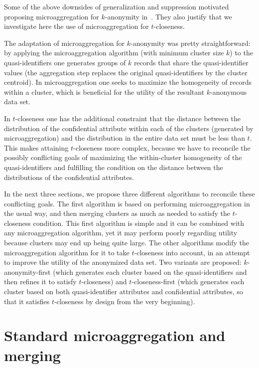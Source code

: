 \documentclass[10pt,journal,compsoc]{IEEEtran}
\theoremstyle{definition}
\theoremstyle{plain}
\begin{document}
Some of the above downsides of generalization and suppression motivated
proposing microaggregation for $k$-anonymity 
in~\cite{Domingo2005Ordinal}. They also justify that we   
investigate here the use of microaggregation 
for $t$-closeness.





The adaptation of microaggregation  for $k$-anonymity
was pretty straightforward: by applying the microaggregation algorithm
(with minimum cluster size $k$) to the quasi-identifiers one generates
groups of $k$ records that share the quasi-identifier values (the
aggregation step replaces the original quasi-identifiers by the cluster
centroid). In microaggregation one seeks to maximize the homogeneity
of records within a cluster, which is beneficial for the utility of
the resultant $k$-anonymous data set. 

In $t$-closeness one has   
the additional constraint that the distance between 
the distribution of the confidential attribute within each of the clusters 
(generated by microaggregation)
and the distribution in the entire data set must be less than $t$.
This makes attaining $t$-closeness more complex, because we have
to reconcile the possibly conflicting goals of maximizing the 
within-cluster homogeneity of the quasi-identifiers and 
fulfilling the condition on the distance between the distributions
of the confidential attributes.


In the next three sections, we propose three different algorithms 
to reconcile these conflicting goals.
The first algorithm is based on performing microaggregation in 
the usual way, 
and then merging clusters as much as needed 
to satisfy the $t$-closeness condition. This first algorithm
is simple and it can be combined with any microaggregation algorithm,
yet it may perform poorly regarding utility because clusters 
may end up being quite large.
The other algorithms modify the
microaggregation algorithm for it to take $t$-closeness into account,
in an attempt to improve the utility of the anonymized data set. Two
variants are proposed: $k$-anonymity-first (which generates each cluster
based on the quasi-identifiers and then refines it to satisfy $t$-closeness)
and $t$-closeness-first (which generates each cluster 
based on both quasi-identifier
attributes and confidential attributes, so that it satisfies $t$-closeness
by design from the very beginning). 

\section{Standard microaggregation and merging\label{sub:micro_merge}}
\end{document}

